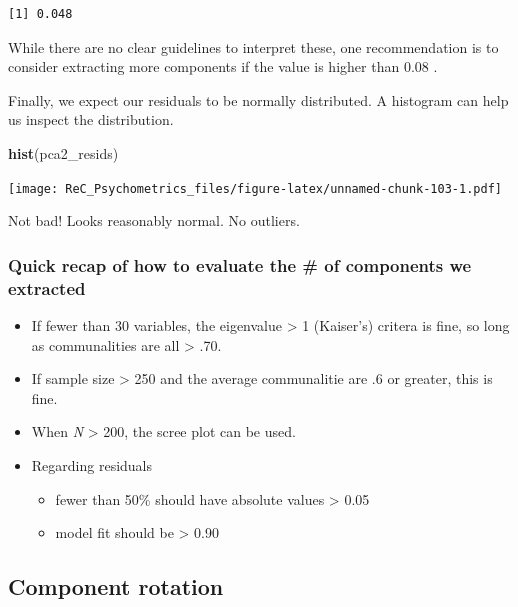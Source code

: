 \documentclass[
  english,
]{book}
\newenvironment{Shaded}{\begin{snugshade}}{\end{snugshade}}
\newcommand{\KeywordTok}[1]{\textcolor[rgb]{0.13,0.29,0.53}{\textbf{#1}}}
\newcommand{\NormalTok}[1]{#1}
\providecommand{\tightlist}{%
  \setlength{\itemsep}{0pt}\setlength{\parskip}{0pt}}
\begin{document}
\begin{verbatim}
[1] 0.048
\end{verbatim}

While there are no clear guidelines to interpret these, one recommendation is to consider extracting more components if the value is higher than 0.08 \citep{field_discovering_2012}.

Finally, we expect our residuals to be normally distributed. A histogram can help us inspect the distribution.

\begin{Shaded}
\begin{Highlighting}[]
\KeywordTok{hist}\NormalTok{(pca2_resids)}
\end{Highlighting}
\end{Shaded}

\texttt{[image: ReC\_Psychometrics\_files/figure-latex/unnamed-chunk-103-1.pdf]}

Not bad! Looks reasonably normal. No outliers.

\hypertarget{quick-recap-of-how-to-evaluate-the-of-components-we-extracted}{%
\subsubsection{Quick recap of how to evaluate the \# of components we extracted}\label{quick-recap-of-how-to-evaluate-the-of-components-we-extracted}}

\begin{itemize}
\tightlist
\item
  If fewer than 30 variables, the eigenvalue \textgreater{} 1 (Kaiser's) critera is fine, so long as communalities are all \textgreater{} .70.
\item
  If sample size \textgreater{} 250 and the average communalitie are .6 or greater, this is fine.
\item
  When \emph{N} \textgreater{} 200, the scree plot can be used.
\item
  Regarding residuals

  \begin{itemize}
  \tightlist
  \item
    fewer than 50\% should have absolute values \textgreater{} 0.05
  \item
    model fit should be \textgreater{} 0.90
  \end{itemize}
\end{itemize}

\hypertarget{component-rotation}{%
\subsection{Component rotation}\label{component-rotation}}
\end{document}
